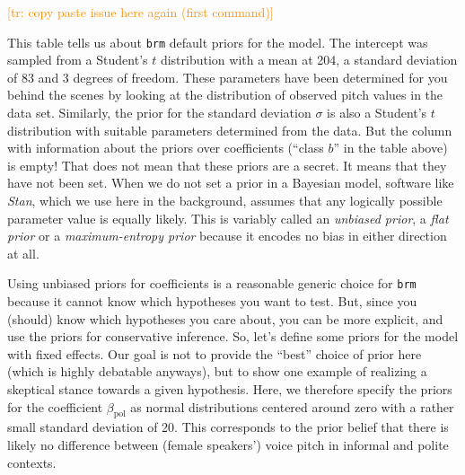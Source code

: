 \documentclass[nobib]{tufte-handout}
\newcommand{\tr}[1]{\textcolor{DarkOrange}{[tr: #1]}}
\begin{document}
\tr{copy paste issue here again (first command)}

This table tells us about \texttt{brm} default priors for the model. The intercept was sampled from a Student's $t$ distribution with a mean at 204, a standard deviation of 83 and 3 degrees of freedom. These parameters have been determined for you behind the scenes by looking at the distribution of observed pitch values in the data set.
%
Similarly, the prior for the standard deviation $\sigma$ is also a Student's $t$ distribution with suitable parameters determined from the data.
But the column with information about the priors over coefficients (``class $b$'' in the table above) is empty!
That does not mean that these priors are a secret.
It means that they have not been set.
When we do not set a prior in a Bayesian model, software like \emph{Stan}, which we use here in the background, assumes that any logically possible parameter value is equally likely.
This is variably called an \textit{unbiased prior}, a \textit{flat prior} or a \textit{maximum-entropy prior} because it encodes no bias in either direction at all.


Using unbiased priors for coefficients is a reasonable generic choice for \texttt{brm} because
it cannot know which hypotheses you want to test. But, since you (should) know which hypotheses
you care about, you can be more explicit, and use the priors for conservative inference. 
%
So,
let's define some priors for the model with fixed effects. Our goal is not to provide the
``best'' choice of prior here (which is highly debatable anyways), but to show one example of realizing
a skeptical stance towards a given hypothesis. Here, we therefore specify the priors for the
coefficient $\beta_{\text{pol}}$ as normal distributions centered around zero with a rather
small standard deviation of 20. This corresponds to the prior belief that there is likely no difference
between (female speakers') voice pitch in informal and polite contexts.
%
%
\end{document}
